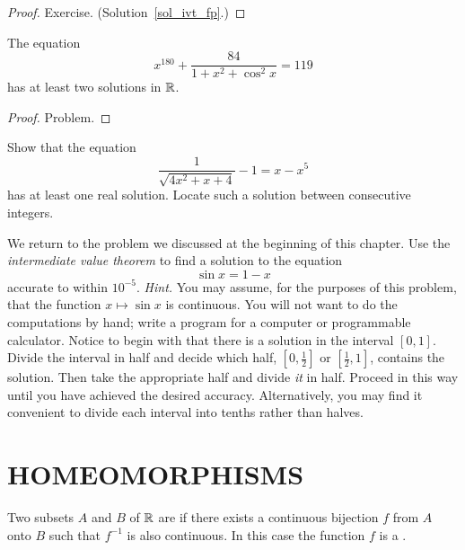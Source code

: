 \begin{proof} Exercise.  (Solution~\ref{sol_ivt_fp}.)    \ns  \end{proof}

\begin{exam} The equation
    \[ x^{180} + \frac{84}{1+x^2+\cos^2x} = 119 \]
has at least two solutions in $\mathbb{R}$.
\end{exam}

\begin{proof} Problem.  \ns   \end{proof}

\begin{prob} Show that the equation
    \[ \frac1{\sqrt{4x^2+x+4}} - 1 = x - x^5 \]
has at least one real solution.  Locate such a solution between consecutive integers.
\end{prob}

\begin{prob}  We return to the problem we discussed at the beginning of this chapter.
Use the \emph{intermediate value theorem} to find a solution to the equation
   \[ \sin x = 1 - x \]
accurate to within $10^{-5}$. \emph{Hint.}  You may assume, for the purposes of this problem,
that the function $x \mapsto \sin x$ is continuous.  You will not want to do the computations
by hand; write a program for a computer or programmable calculator.  Notice to begin with that
there is a solution in the interval $[0, 1]$. Divide the interval in half and decide which
half, $[0,\frac12]$ or $[\frac12,1]$, contains the solution.  Then take the appropriate half
and divide \emph{it} in half. Proceed in this way until you have achieved the desired
accuracy.  Alternatively, you may find it convenient to divide each interval into tenths
rather than halves.
\end{prob}







\section{HOMEOMORPHISMS}
\begin{defn} Two subsets $A$ and $B$ of $\mathbb{R}$ are
 if there exists a continuous bijection $f$ from $A$ onto $B$ such that
$f^{-1}$ is also continuous.  In this case the function $f$ is a
.
\end{defn}

